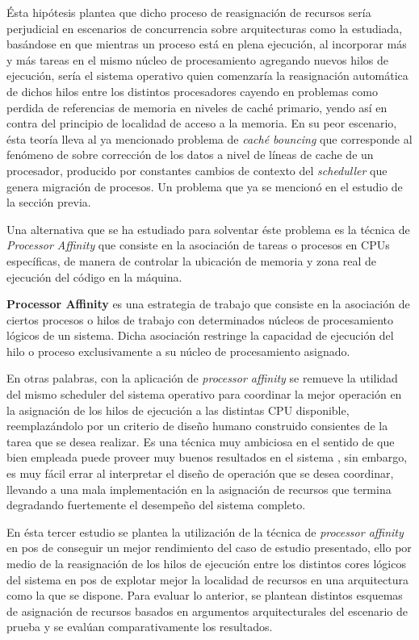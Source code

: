 Ésta hipótesis plantea que dicho proceso de reasignación de recursos sería perjudicial en escenarios de concurrencia sobre arquitecturas como la estudiada, basándose en que mientras un proceso está en plena ejecución, al incorporar más y más tareas en el mismo núcleo de procesamiento agregando nuevos hilos de ejecución, sería el sistema operativo quien comenzaría la reasignación automática de dichos hilos entre los distintos procesadores cayendo en problemas como perdida de referencias de memoria en niveles de caché primario, yendo así en contra del principio de localidad de acceso a la memoria. En su peor escenario, ésta teoría lleva al ya mencionado problema de \emph{caché bouncing} que corresponde al fenómeno de sobre corrección de los datos a nivel de líneas de cache de un procesador, producido por constantes cambios de contexto del \emph{scheduller} que genera migración de procesos. Un problema que ya se mencionó en el estudio de la sección previa.

Una alternativa que se ha estudiado para solventar éste problema es la técnica de \emph{Processor Affinity} que consiste en la asociación de tareas o procesos en CPUs específicas, de manera de controlar la ubicación de memoria y zona real de ejecución del código en la máquina.
\begin{defn} \textbf{Processor Affinity} es una estrategia de trabajo que consiste en la asociación de ciertos procesos o hilos de trabajo con determinados núcleos de procesamiento lógicos de un sistema. Dicha asociación restringe la capacidad de ejecución del hilo o proceso exclusivamente a su núcleo de procesamiento asignado.
\end{defn}
En otras palabras, con la aplicación de \emph{processor affinity} se remueve la utilidad del mismo scheduler del sistema operativo para coordinar la mejor operación en la asignación de los hilos de ejecución a las distintas CPU disponible, reemplazándolo por un criterio de diseño humano construido consientes de la tarea que se desea realizar. Es una técnica muy ambiciosa en el sentido de que bien empleada puede proveer muy buenos resultados en el sistema \cite{paper:cacheaffinity}, sin embargo, es muy fácil errar al interpretar el diseño de operación que se desea coordinar, llevando a una mala implementación en la asignación de recursos que termina degradando fuertemente el desempeño del sistema completo.

En ésta tercer estudio se plantea la utilización de la técnica de \emph{processor affinity} en pos de conseguir un mejor rendimiento del caso de estudio presentado, ello por medio de la reasignación de los hilos de ejecución entre los distintos cores lógicos del sistema en pos de explotar mejor la localidad de recursos en una arquitectura como la que se dispone. Para evaluar lo anterior, se plantean distintos esquemas de asignación de recursos basados en argumentos arquitecturales del escenario de prueba y se evalúan comparativamente los resultados.

